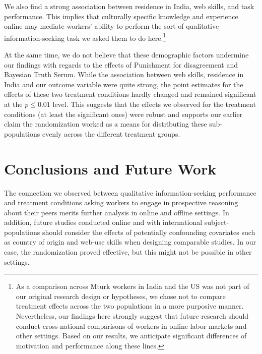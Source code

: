 \documentclass{cscw2010}
\begin{document}
We also find a strong association between residence in
India, web skills, and task
performance. This implies that culturally specific knowledge and
experience online may mediate workers'
ability to perform the sort of qualitative information-seeking task we
asked them to do here.\footnote{As a comparison across Mturk workers
  in India and the US was not part of our original research design
  or hypotheses, we chose not to compare treatment effects across the
  two populations in a more purposive manner. Nevertheless, our
  findings here strongly suggest that future research should conduct
  cross-national comparisons of workers in online labor markets and
  other settings. Based on our results, we anticipate significant
  differences of motivation and performance along these
  lines.\cite{antin2011desirability}}

At the same time, we do not believe that these demographic factors
undermine our findings with regards to the effects of Punishment for
disagreement and Bayesian Truth Serum. While the association between
web skills, residence in India and our outcome variable were quite
strong, the point estimates for the effects of these two treatment
conditions hardly changed and remained significant at the $p\leq 0.01$
level. This suggests that the effects we observed for the treatment
conditions (at least the significant ones) were robust and supports
our earlier claim the randomization worked as a means for distributing
these sub-populations evenly across the different treatment groups.

\section{Conclusions and Future Work}

The connection we observed between qualitative information-seeking
performance and treatment conditions asking workers to engage in
prospective reasoning about their peers merits further analysis in
online and offline settings. In addition, future studies conducted
online and with international subject-populations should consider the
effects of potentially confounding covariates such as country of
origin and web-use skills when designing comparable studies. In our
case, the randomization proved effective, but this might not be
possible in other settings. 
\end{document}
